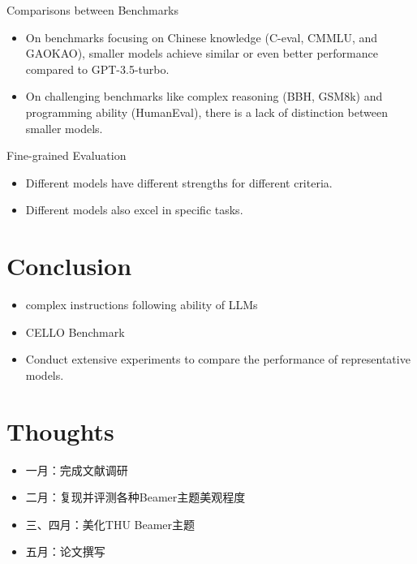 \documentclass{beamer}
\begin{document}
\begin{frame}{Comparisons between Benchmarks}
    \begin{itemize}
        \item {On benchmarks focusing on Chinese knowledge (C-eval, CMMLU, and GAOKAO), smaller models achieve similar or even better performance compared to GPT-3.5-turbo.}
        \item {On challenging benchmarks like complex reasoning (BBH, GSM8k) and programming ability (HumanEval), there is a lack of distinction between smaller models.}
    \end{itemize}
\end{frame}

\begin{frame}{Fine-grained Evaluation}
    \begin{itemize}
        \item {Different models have different strengths for different criteria.}
        \item {Different models also excel in specific tasks.}
    \end{itemize}
\end{frame}

\section{Conclusion}

\begin{frame}
    \begin{itemize}
        \item {complex instructions following ability of LLMs}
        \item {CELLO Benchmark}
        \item {Conduct extensive experiments to compare the performance of representative models.}
    \end{itemize}
\end{frame}

\section{Thoughts}

\begin{frame}
    \begin{itemize}
        \item 一月：完成文献调研
        \item 二月：复现并评测各种Beamer主题美观程度
        \item 三、四月：美化THU Beamer主题
        \item 五月：论文撰写
    \end{itemize}
\end{frame}
\end{document}
